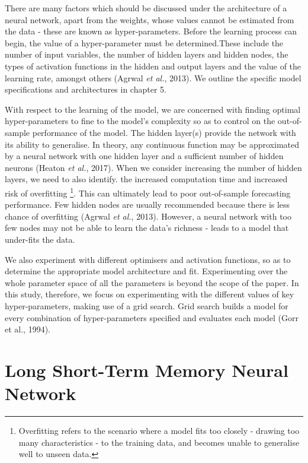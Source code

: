 There are many factors which should be discussed under the architecture of a neural network, apart from the weights, whose values cannot be estimated from the data - these are known as hyper-parameters. Before the learning process can begin, the value of a hyper-parameter must be determined.These include the number of input variables, the number of hidden layers and hidden nodes, the types of activation functions in the hidden and output layers and the value of the learning rate, amongst others (Agrwal \textit{et al.}, 2013). We outline the specific model specifications and architectures in chapter 5. 

With respect to the learning of the model, we are concerned with finding optimal hyper-parameters to fine to the model's complexity so as to control on the out-of-sample performance of the model. The hidden layer(s) provide the network with its ability to generalise. In theory, any continuous function may be approximated by a neural network with one hidden layer and a sufficient number of hidden neurons (Heaton \textit{et al.}, 2017). When we consider increasing the number of hidden layers, we need to also identify. the increased  computation time and increased risk of overfitting \footnote{Overfitting refers to the scenario where a model fits too closely - drawing too many characteristics - to the training data, and becomes unable to generalise well to unseen data.}. This can ultimately lead to poor out-of-sample forecasting performance. Few hidden nodes are usually recommended because there is less chance of overfitting (Agrwal \textit{et al.}, 2013). However, a neural network with too few nodes may not be able to learn the data's richness - leads to a model that under-fits the data. 

We also experiment with different optimisers and activation functions, so as to determine the appropriate model architecture and fit. Experimenting over the whole parameter space of all the parameters is beyond the scope of the paper. In this study, therefore, we focus on experimenting with the different values of key hyper-parameters, making use of a grid search. Grid search builds a model for every combination of hyper-parameters specified and evaluates each model (Gorr et al., 1994). 


\section{Long Short-Term Memory Neural Network}

